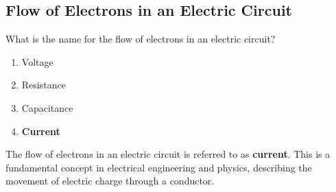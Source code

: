 \subsection{Flow of Electrons in an Electric Circuit}
\label{T5A03}

\begin{tcolorbox}[colback=gray!10!white,colframe=black!75!black,title=T5A03]
What is the name for the flow of electrons in an electric circuit?
\begin{enumerate}[noitemsep]
    \item Voltage
    \item Resistance
    \item Capacitance
    \item \textbf{Current}
\end{enumerate}
\end{tcolorbox}

The flow of electrons in an electric circuit is referred to as \textbf{current}. This is a fundamental concept in electrical engineering and physics, describing the movement of electric charge through a conductor.